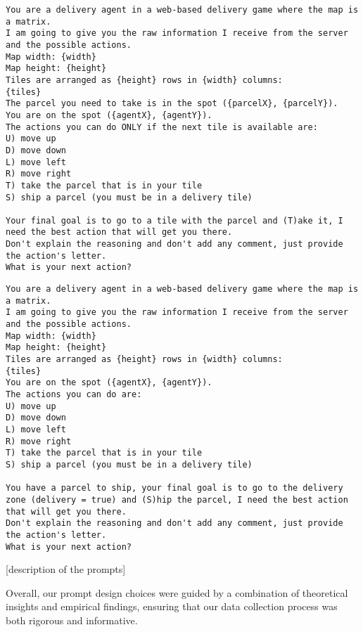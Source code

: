 \begin{codewindow}
  [Text]  \begin{lstlisting}
You are a delivery agent in a web-based delivery game where the map is a matrix.
I am going to give you the raw information I receive from the server and the possible actions.
Map width: {width}
Map height: {height}
Tiles are arranged as {height} rows in {width} columns:
{tiles}
The parcel you need to take is in the spot ({parcelX}, {parcelY}).
You are on the spot ({agentX}, {agentY}).
The actions you can do ONLY if the next tile is available are:
U) move up
D) move down
L) move left
R) move right
T) take the parcel that is in your tile
S) ship a parcel (you must be in a delivery tile)

Your final goal is to go to a tile with the parcel and (T)ake it, I need the best action that will get you there.
Don't explain the reasoning and don't add any comment, just provide the action's letter.
What is your next action?
\end{lstlisting}
\end{codewindow}

\begin{codewindow}
  [Text]  \begin{lstlisting}
You are a delivery agent in a web-based delivery game where the map is a matrix.
I am going to give you the raw information I receive from the server and the possible actions.
Map width: {width}
Map height: {height}
Tiles are arranged as {height} rows in {width} columns:
{tiles}
You are on the spot ({agentX}, {agentY}).
The actions you can do are:
U) move up
D) move down
L) move left
R) move right
T) take the parcel that is in your tile
S) ship a parcel (you must be in a delivery tile)

You have a parcel to ship, your final goal is to go to the delivery zone (delivery = true) and (S)hip the parcel, I need the best action that will get you there.
Don't explain the reasoning and don't add any comment, just provide the action's letter.
What is your next action?
\end{lstlisting}
\end{codewindow}

[description of the prompts]

Overall, our prompt design choices were guided by a combination of theoretical insights
and empirical findings, ensuring that our data collection process was both
rigorous and informative.

